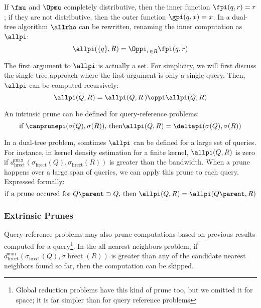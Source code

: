 \documentclass[times, 10pt,twocolumn]{article}
\DeclareMathOperator{\hrect}{hrect}
\begin{document}
\noindent If $\fmu$ and $\Opmu$ completely distributive, then the inner function $\fpi(q, r) = r$; if they are not distributive, then the outer function $\gpi(q, x) = x$.
In a dual-tree algorithm $\allrho$ can be rewritten, renaming the inner computation as $\allpi$:
\begin{equation}
\allpi(\{q\}, R) = \Oppi_{r \in R} \fpi(q, r)
\label{eqn:defpi}
\end{equation}

\noindent The first argument to $\allpi$ is actually a set.
For simplicity, we will first discuss the single tree approach where the first argument is only a single query.
Then, $\allpi$ can be computed recursively:
\begin{equation}
\allpi(Q, R) = \allpi(Q, R\left) \oppi \allpi(Q, R\right)
\label{eqn:dividepi}
\end{equation}

\noindent An intrinsic prune can be defined for query-reference problems:
\begin{equation}
\mbox{if } \canprunepi(\sigma(Q), \sigma(R)) \mbox{, then} \allpi(Q, R) = \deltapi(\sigma(Q), \sigma(R))
\label{eqn:prunepi}
\end{equation}

In a dual-tree problem, somtimes $\allpi$ can be defined for a large set of queries.
For instance, in kernel density estimation for a finite kernel, $\allpi(Q, R)$ is zero if $d^{\max}_{\hrect}(\sigma_{\hrect}(Q), \sigma_{\hrect}(R))$ is greater than the bandwidth.
When a prune happens over a large span of queries, we can apply this prune to each query.
Expressed formally:
\begin{equation}
\mbox{if a prune occured for } Q\parent \supset Q \mbox{, then } \allpi(Q, R) = \allpi(Q\parent, R)
\end{equation}

\subsubsection{Extrinsic Prunes}

Query-reference problems may also prune computations based on previous results computed for a query\footnote{Global reduction problems have this kind of prune too, but we omitted it for space; it is far simpler than for query reference problems}.
In the all nearest neighbors problem, if $d^{\min}_{\hrect}(\sigma_{\hrect}(Q), \sigma{\hrect}(R))$ is greater than any of the candidate nearest neighbors found so far, then the computation can be skipped.
\end{document}
